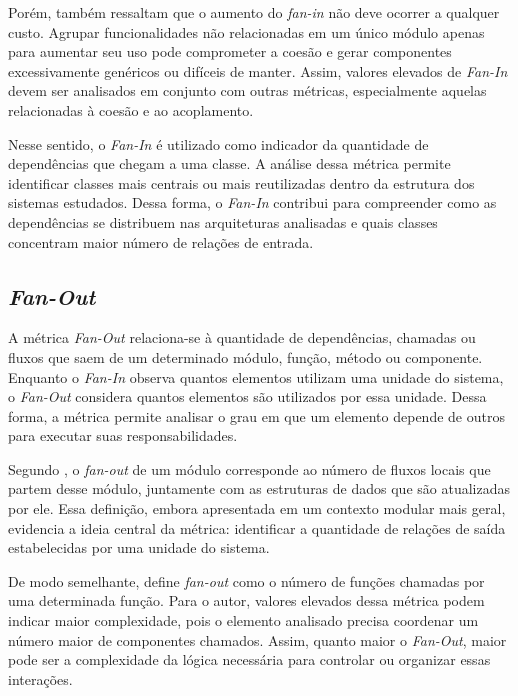Porém,  também ressaltam que o aumento do \textit{fan-in} não deve ocorrer a qualquer custo. Agrupar 
funcionalidades não relacionadas em um único módulo apenas para aumentar seu uso pode comprometer a coesão e gerar componentes 
excessivamente genéricos ou difíceis de manter. Assim, valores elevados de \textit{Fan-In} devem ser analisados em conjunto com 
outras métricas, especialmente aquelas relacionadas à coesão e ao acoplamento.

Nesse sentido, o \textit{Fan-In} é utilizado como indicador da quantidade de dependências que chegam a uma classe. 
A análise dessa métrica permite identificar classes mais centrais ou mais reutilizadas dentro da estrutura dos sistemas estudados. 
Dessa forma, o \textit{Fan-In} contribui para compreender como as dependências se distribuem nas arquiteturas analisadas e quais 
classes concentram maior número de relações de entrada.

\subsection{\textit{Fan-Out}}
\label{sec:fan-out}

A métrica \textit{Fan-Out} relaciona-se à quantidade de dependências, chamadas ou fluxos que saem de um determinado 
módulo, função, método ou componente. Enquanto o \textit{Fan-In} observa quantos elementos utilizam uma unidade do sistema, 
o \textit{Fan-Out} considera quantos elementos são utilizados por essa unidade. Dessa forma, a métrica permite analisar o 
grau em que um elemento depende de outros para executar suas responsabilidades.

Segundo , o \textit{fan-out} de um módulo corresponde ao número de fluxos locais que partem desse 
módulo, juntamente com as estruturas de dados que são atualizadas por ele. Essa definição, embora apresentada em um contexto 
modular mais geral, evidencia a ideia central da métrica: identificar a quantidade de relações de saída estabelecidas por 
uma unidade do sistema.

De modo semelhante,  define \textit{fan-out} como o número de funções chamadas por uma determinada 
função. Para o autor, valores elevados dessa métrica podem indicar maior complexidade, pois o elemento analisado precisa coordenar 
um número maior de componentes chamados. Assim, quanto maior o \textit{Fan-Out}, maior pode ser a complexidade da lógica necessária 
para controlar ou organizar essas interações.

